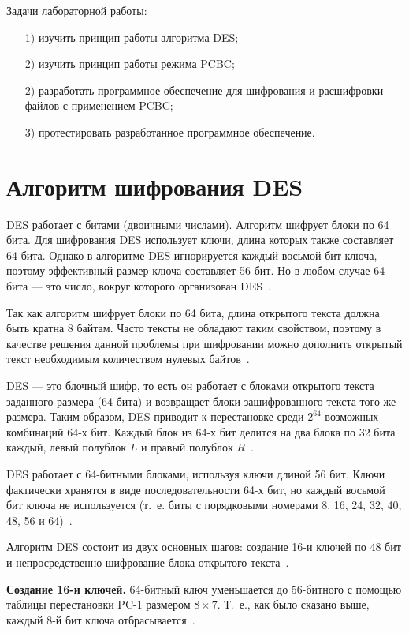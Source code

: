\documentclass{bmstu}
\begin{document}
Задачи лабораторной работы:
\begin{enumerate}
\item[1)] изучить принцип работы алгоритма DES;
\item[2)] изучить принцип работы режима PCBC;
\item[2)] разработать программное обеспечение для шифрования и расшифровки файлов с применением PCBC;
\item[3)] протестировать разработанное программное обеспечение.
\end{enumerate}

\chapter{Алгоритм шифрования DES}

DES работает с битами (двоичными числами). 
Алгоритм шифрует блоки по 64 бита. 
Для шифрования DES использует ключи, длина которых также составляет 64 бита. 
Однако в алгоритме DES игнорируется каждый восьмой бит ключа, поэтому эффективный размер ключа составляет 56 бит. 
Но в любом случае 64 бита --- это число, вокруг которого организован DES~\cite{grabbe}.

Так как алгоритм шифрует блоки по 64 бита, длина открытого текста должна быть кратна 8 байтам. 
Часто тексты не обладают таким свойством, поэтому в качестве решения данной проблемы при шифровании можно дополнить открытый текст необходимым количеством нулевых байтов~\cite{grabbe}.

DES --- это блочный шифр, то есть он работает с блоками открытого текста заданного размера (64 бита) и возвращает блоки зашифрованного текста того же размера. 
Таким образом, DES приводит к перестановке среди $2^{64}$ возможных комбинаций 64-х бит. 
Каждый блок из 64-х бит делится на два блока по 32 бита каждый, левый полублок $L$ и правый полублок $R$~\cite{grabbe}.

DES работает с 64-битными блоками, используя ключи длиной 56 бит. 
Ключи фактически хранятся в виде последовательности 64-х бит, но каждый восьмой бит ключа не используется (т.~е. биты с порядковыми номерами 8, 16, 24, 32, 40, 48, 56 и 64)~\cite{grabbe}.

Алгоритм DES состоит из двух основных шагов: создание 16-и ключей по 48 бит и непросредственно шифрование блока открытого текста~\cite{grabbe}.

\textbf{Создание 16-и ключей.} 
64-битный ключ уменьшается до 56-битного с помощью таблицы перестановки PC-1 размером $8 \times 7$. 
Т.~е., как было сказано выше, каждый 8-й бит ключа отбрасывается~\cite{grabbe}.
\end{document}
